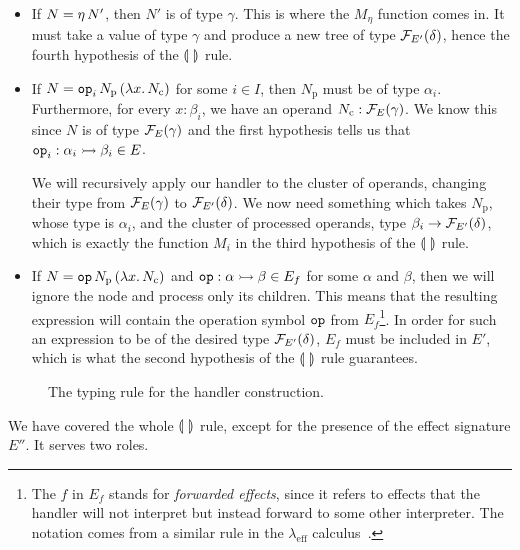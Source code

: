 \begin{itemize}
\item If $N = \eta\,N'$, then $N'$ is of type $\gamma$. This is where the
  $M_\eta$ function comes in. It must take a value of type $\gamma$ and
  produce a new tree of type $\mathcal{F}_{E'}(\delta)$, hence the fourth
  hypothesis of the $\llparenthesis \,  \, \rrparenthesis$ rule.

\item If $N = \mathtt{op}_i\,N_{\mathrm{p}}\,(\lambda x.\, N_{\mathrm{c}})$
  for some $i \in I$, then $N_{\mathrm{p}}$ must be of type
  $\alpha_i$. Furthermore, for every $x : \beta_i$, we have an operand
  $N_{\mathrm{c}} : \mathcal{F}_E(\gamma)$. We know this since $N$ is of type
  $\mathcal{F}_E(\gamma)$ and the first hypothesis tells us that
  $\mathtt{op}_i : \alpha_i \rightarrowtail \beta_i \in E$.

  We will recursively apply our handler to the cluster of operands,
  changing their type from $\mathcal{F}_E(\gamma)$ to $\mathcal{F}_{E'}(\delta)$. We now
  need something which takes $N_{\mathrm{p}}$, whose type is $\alpha_i$,
  and the cluster of processed operands, type
  $\beta_i \to \mathcal{F}_{E'}(\delta)$, which is exactly the function $M_i$ in
  the third hypothesis of the $\llparenthesis \,  \, \rrparenthesis$ rule.

\item If $N = \mathtt{op}\,N_{\mathrm{p}}\,(\lambda x.\, N_{\mathrm{c}})$ and
  $\mathtt{op} : \alpha \rightarrowtail \beta \in E_f$ for some $\alpha$ and $\beta$, then
  we will ignore the node and process only its children. This means that
  the resulting expression will contain the operation symbol $\mathtt{op}$ from
  $E_f$\footnote{The $f$ in $E_f$ stands for \emph{forwarded effects},
    since it refers to effects that the handler will not interpret but
    instead forward to some other interpreter. The notation comes from a
    similar rule in the $\lambda_{\mathrm{eff}}$
    calculus~\cite{kammar2013handlers}.}. In order for such an expression
  to be of the desired type $\mathcal{F}_{E'}(\delta)$, $E_f$ must be included in
  $E'$, which is what the second hypothesis of the $\llparenthesis \,  \, \rrparenthesis$ rule
  guarantees.
\end{itemize}

\begin{figure}
  \handlerrule
  \caption{\label{fig:handler-rule} The typing rule for the handler
    construction.}
\end{figure}

We have covered the whole $\llparenthesis \,  \, \rrparenthesis$ rule, except for the presence of the
effect signature $E''$. It serves two roles.

